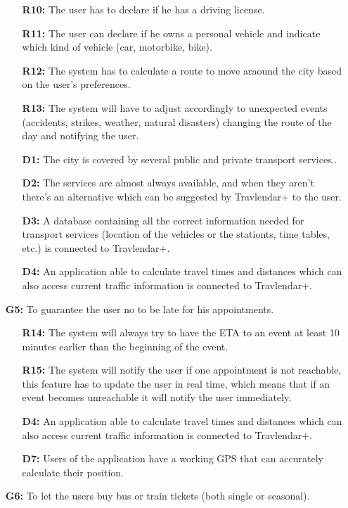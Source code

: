 \documentclass{article}
\begin{document}
\begin{enumerate}
\begin{enumerate}
\item[\textbf{R10:}] The user has to declare if he has a driving license.
\item[\textbf{R11:}] The user can declare if he owns a personal vehicle and indicate which kind of vehicle (car, motorbike, bike).
\item[\textbf{R12:}] The system has to calculate a route to move araound the city based on the user's preferences.
\item[\textbf{R13:}] The system will have to adjust accordingly to unexpected events (accidents, strikes, weather, natural disasters) changing the route of the day and notifying the user.
\item[\textbf{D1:}] The city is covered by several public and private transport services..
\item[\textbf{D2:}] The services are almost always available, and when they aren’t there’s an alternative which can be suggested by Travlendar+ to the user.
\item[\textbf{D3:}] A database containing all the correct information needed for transport services (location of the vehicles or the stationts, time tables, etc.) is connected to Travlendar+.
\item[\textbf{D4:}] An application able to calculate travel times and distances which can also access current traffic information is connected to Travlendar+.
\end{enumerate}
\item[\textbf{G5:}] To guarantee the user no to be late for his appointments.
\begin{enumerate}
\item[\textbf{R14:}] The system will always try to have the ETA to an event at least 10 minutes earlier than the beginning of the event.
\item[\textbf{R15:}] The system will notify the user if one appointment is not reachable, this feature has to update the user in real time, which means that if an event becomes unreachable it will notify the user immediately.
\item[\textbf{D4:}] An application able to calculate travel times and distances which can also access current traffic information is connected to Travlendar+.
\item[\textbf{D7:}] Users of the application have a working GPS that can accurately calculate their position.
\end{enumerate}
\item[\textbf{G6:}] To let the users buy bus or train tickets (both single or seasonal).

\end{enumerate}
\end{document}
